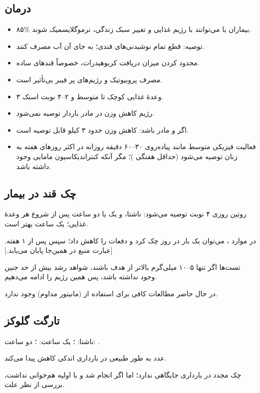 \documentclass[12pt,a4paper]{article}
\begin{document}
\subsection*{درمان }
\begin{itemize}
\item ۸۵\% بیماران با  می‌توانند با رژیم غذایی و تغییر سبک زندگی، نرموگلایسمیک شوند.
\item توصیه: قطع تمام نوشیدنی‌های قندی؛ به جای آن آب مصرف کنند.
\item محدود کردن میزان دریافت کربوهیدرات، خصوصاً قندهای ساده.
\item مصرف پروبیوتیک و رژیم‌های پر فیبر بی‌تأثیر است.
\item ۳ وعدهٔ غذایی کوچک تا متوسط و ۲--۴ نوبت اسنک.
\item رژیم کاهش وزن در مادر باردار توصیه نمی‌شود.
\item اگر  و مادر  باشد: کاهش وزن حدود ۳ کیلو قابل توصیه است.
\item فعالیت فیزیکی متوسط مانند پیاده‌روی ۳۰--۶۰ دقیقه روزانه در اکثر روزهای هفته به زنان  توصیه می‌شود (حداقل هفتگی )؛ مگر آنکه کنتراندیکاسیون مامایی وجود داشته باشد.
\end{itemize}
\subsection*{چک قند در بیمار }
روتین روزی ۴ نوبت توصیه می‌شود: ناشتا، و یک یا دو ساعت پس از شروع هر وعدهٔ غذایی؛ یک ساعت بهتر است.

در موارد ، می‌توان یک بار در روز چک کرد و دفعات را کاهش داد؛ سپس پس از ۱ هفته. [عبارت منبع در همین‌جا پایان می‌یابد.]

تست‌ها اگر تنها ۵--۱۰ میلی‌گرم بالاتر از هدف باشند، شواهد رشد بیش از حد جنین وجود نداشته باشد، پس همین رژیم را ادامه می‌دهیم.

در حال حاضر مطالعات کافی برای استفاده از  (مانیتور مداوم) وجود ندارد.
\subsection*{تارگت گلوکز}
ناشتا: ؛ یک ساعت: ؛ دو ساعت: .

عدد  به طور طبیعی در بارداری اندکی کاهش پیدا می‌کند.

چک مجدد  در بارداری  جایگاهی ندارد؛ اما اگر انجام شد و با  اولیه هم‌خوانی نداشت، بررسی از نظر علت.
\end{document}
